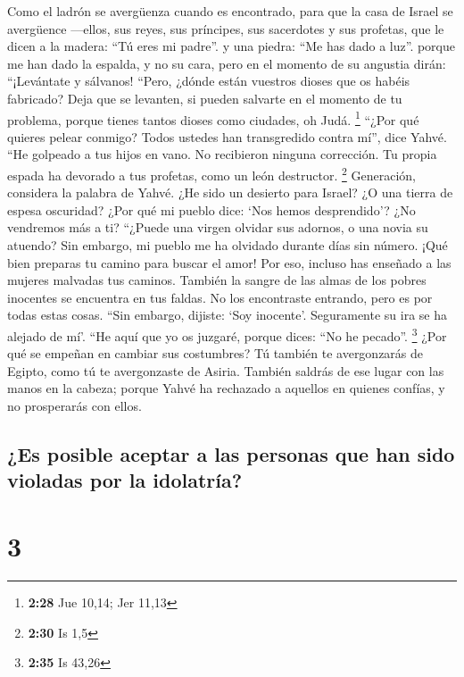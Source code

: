  Como el ladrón se avergüenza cuando es encontrado, para
que la casa de Israel se avergüence ---ellos, sus reyes, sus príncipes,
sus sacerdotes y sus profetas,  que le dicen a la madera:
``Tú eres mi padre''. y una piedra: ``Me has dado a luz''. porque me han
dado la espalda, y no su cara, pero en el momento de su angustia dirán:
``¡Levántate y sálvanos!  ``Pero, ¿dónde están vuestros
dioses que os habéis fabricado? Deja que se levanten, si pueden salvarte
en el momento de tu problema, porque tienes tantos dioses como ciudades,
oh Judá. \footnote{\textbf{2:28} Jue 10,14; Jer 11,13} 
``¿Por qué quieres pelear conmigo? Todos ustedes han transgredido contra
mí'', dice Yahvé.  ``He golpeado a tus hijos en vano. No
recibieron ninguna corrección. Tu propia espada ha devorado a tus
profetas, como un león destructor. \footnote{\textbf{2:30} Is 1,5}
 Generación, considera la palabra de Yahvé. ¿He sido un
desierto para Israel? ¿O una tierra de espesa oscuridad? ¿Por qué mi
pueblo dice: `Nos hemos desprendido'? ¿No vendremos más a ti?
 ``¿Puede una virgen olvidar sus adornos, o una novia su
atuendo? Sin embargo, mi pueblo me ha olvidado durante días sin número.
 ¡Qué bien preparas tu camino para buscar el amor! Por
eso, incluso has enseñado a las mujeres malvadas tus caminos.
 También la sangre de las almas de los pobres inocentes
se encuentra en tus faldas. No los encontraste entrando, pero es por
todas estas cosas.  ``Sin embargo, dijiste: `Soy
inocente'. Seguramente su ira se ha alejado de mí'. ``He aquí que yo os
juzgaré, porque dices: ``No he pecado''. \footnote{\textbf{2:35} Is
  43,26}  ¿Por qué se empeñan en cambiar sus costumbres?
Tú también te avergonzarás de Egipto, como tú te avergonzaste de Asiria.
 También saldrás de ese lugar con las manos en la cabeza;
porque Yahvé ha rechazado a aquellos en quienes confías, y no
prosperarás con ellos.

\hypertarget{es-posible-aceptar-a-las-personas-que-han-sido-violadas-por-la-idolatruxeda}{%
\subsection{¿Es posible aceptar a las personas que han sido violadas por
la
idolatría?}\label{es-posible-aceptar-a-las-personas-que-han-sido-violadas-por-la-idolatruxeda}}

\hypertarget{section-2}{%
\section{3}\label{section-2}}

